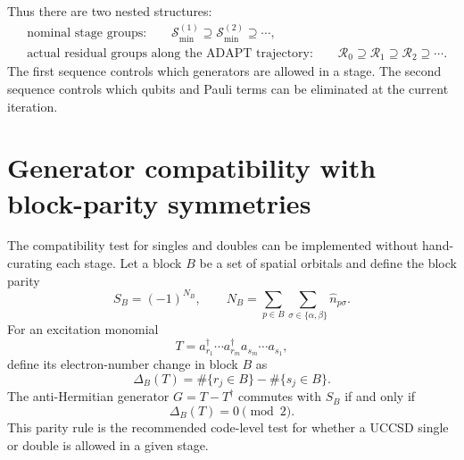 \documentclass[11pt]{article}
\begin{document}
Thus there are two nested structures:
\begin{align}
    &\text{nominal stage groups:}\qquad
    \mathcal S_{\min}^{(1)}\supseteq\mathcal S_{\min}^{(2)}\supseteq\cdots,\\
    &\text{actual residual groups along the ADAPT trajectory:}\qquad
    \mathcal R_0\supseteq\mathcal R_1\supseteq\mathcal R_2\supseteq\cdots .
\end{align}
The first sequence controls which generators are allowed in a stage. The second sequence controls which qubits and Pauli terms can be eliminated at the current iteration.

\section{Generator compatibility with block-parity symmetries}
\label{sec:compatibility}

The compatibility test for singles and doubles can be implemented without hand-curating each stage. Let a block $B$ be a set of spatial orbitals and define the block parity
\begin{equation}
    S_B=(-1)^{N_B},\qquad
    N_B=\sum_{p\in B}\sum_{\sigma\in\{\alpha,\beta\}} \hat n_{p\sigma}.
\end{equation}
For an excitation monomial
\begin{equation}
    T=a_{r_1}^{\dagger}\cdots a_{r_m}^{\dagger}
      a_{s_m}\cdots a_{s_1},
\end{equation}
define its electron-number change in block $B$ as
\begin{equation}
    \Delta_B(T)=
    \#\{r_j\in B\}-\#\{s_j\in B\}.
\end{equation}
The anti-Hermitian generator $G=T-T^{\dagger}$ commutes with $S_B$ if and only if
\begin{equation}
    \Delta_B(T)=0\pmod 2.
    \label{eq:block-parity-rule}
\end{equation}
This parity rule is the recommended code-level test for whether a UCCSD single or double is allowed in a given stage.
\end{document}

